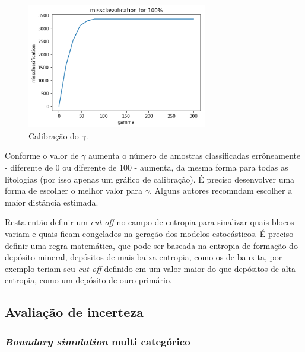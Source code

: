 \begin{figure}[!ht]
	\caption{\label{calib_gamma}Calibração do $\gamma$.}
	\begin{center}
		\includegraphics[width=0.7\textwidth]{capitulo_3/calib100.png}
	\end{center}
\end{figure}

Conforme o valor de $\gamma$ aumenta o número de amostras classificadas errôneamente - diferente de 0 ou diferente de 100 - aumenta, da mesma forma para todas as litologias (por isso apenas um gráfico de calibração). É preciso desenvolver uma forma de escolher o melhor valor para $\gamma$. Alguns autores recomndam escolher a maior distância estimada.

Resta então definir um \textit{cut off} no campo de entropia para sinalizar quais blocos variam e quais ficam congelados na geração dos modelos estocásticos. É preciso definir uma regra matemática, que pode ser baseada na entropia de formação do depósito mineral, depósitos de mais baixa entropia, como os de bauxita, por exemplo teriam seu \textit{cut off} definido em um valor maior do que depósitos de alta entropia, como um depósito de ouro primário.

\subsection{Avaliação de incerteza}

\subsubsection{\textit{Boundary simulation} multi categórico}

